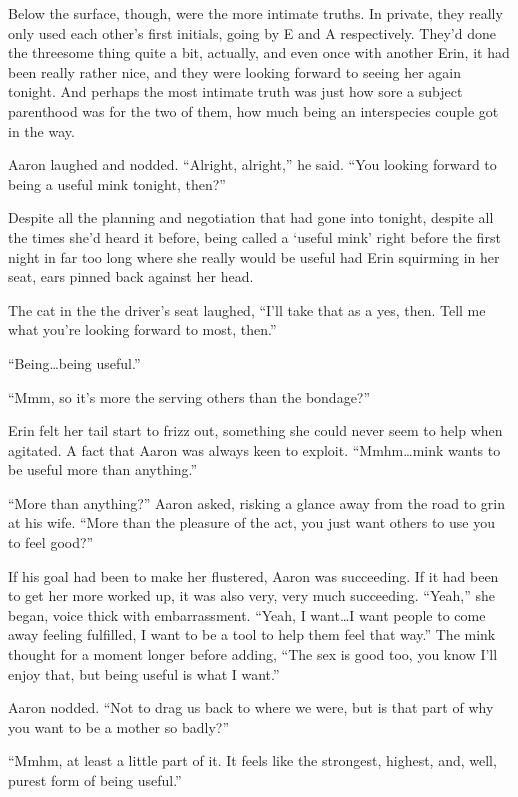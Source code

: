 Below the surface, though, were the more intimate truths. In private, they really only used each other's first initials, going by E and A respectively. They'd done the threesome thing quite a bit, actually, and even once with another Erin, it had been really rather nice, and they were looking forward to seeing her again tonight. And perhaps the most intimate truth was just how sore a subject parenthood was for the two of them, how much being an interspecies couple got in the way.

Aaron laughed and nodded. ``Alright, alright,'' he said. ``You looking forward to being a useful mink tonight, then?''

Despite all the planning and negotiation that had gone into tonight, despite all the times she'd heard it before, being called a `useful mink' right before the first night in far too long where she really would be useful had Erin squirming in her seat, ears pinned back against her head.

The cat in the the driver's seat laughed, ``I'll take that as a yes, then. Tell me what you're looking forward to most, then.''

``Being\ldots{}being useful.''

``Mmm, so it's more the serving others than the bondage?''

Erin felt her tail start to frizz out, something she could never seem to help when agitated. A fact that Aaron was always keen to exploit. ``Mmhm\ldots{}mink wants to be useful more than anything.''

``More than anything?'' Aaron asked, risking a glance away from the road to grin at his wife. ``More than the pleasure of the act, you just want others to use you to feel good?''

If his goal had been to make her flustered, Aaron was succeeding. If it had been to get her more worked up, it was also very, very much succeeding. ``Yeah,'' she began, voice thick with embarrassment. ``Yeah, I want\ldots{}I want people to come away feeling fulfilled, I want to be a tool to help them feel that way.'' The mink thought for a moment longer before adding, ``The sex is good too, you know I'll enjoy that, but being useful is what I want.''

Aaron nodded. ``Not to drag us back to where we were, but is that part of why you want to be a mother so badly?''

``Mmhm, at least a little part of it. It feels like the strongest, highest, and, well, purest form of being useful.''

